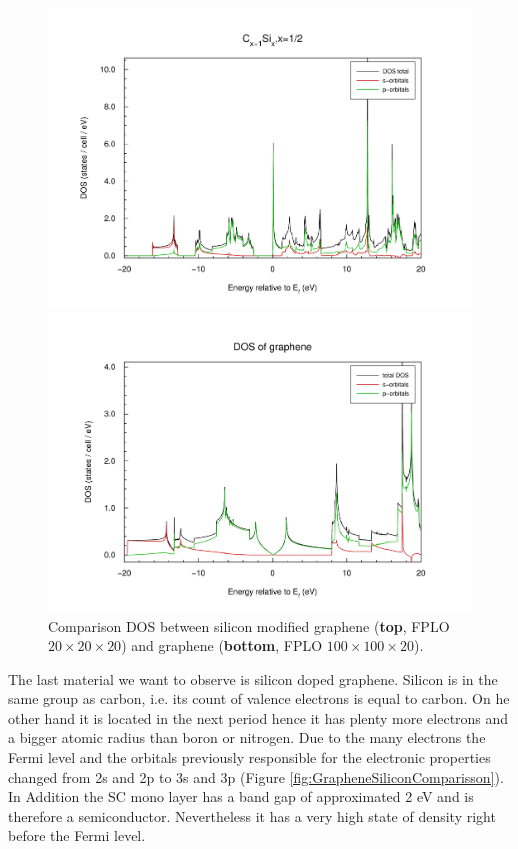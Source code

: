 				\begin{figure}
					\begin{minipage}[t]{\textwidth}
						\includegraphics[width=\textwidth]{Results/Silicon/Silicon1R/dos.pdf}
					\end{minipage}
					\begin{minipage}[t]{\textwidth}
						\includegraphics[width=\textwidth]{Results/Graphene/GrapheneNew/dos.pdf}
					\end{minipage}											
					\caption{Comparison DOS between silicon modified graphene (\textbf{top}, FPLO $20\times20\times20$) and graphene (\textbf{bottom}, FPLO $100\times100\times20$).}
					\label{fig:GrapheneSiliconDOSComparisson}
				\end{figure}
				The last material we want to observe is silicon doped graphene. Silicon is in the same group as carbon, i.e. its count of valence electrons is equal to carbon. On he other hand it is located in the next period hence it has plenty more electrons and a bigger atomic radius than boron or nitrogen. Due to the many electrons the Fermi level and the orbitals previously responsible for the electronic properties changed from 2s and 2p to 3s and 3p (Figure \ref{fig:GrapheneSiliconComparisson}). In Addition the SC mono layer has a band gap of approximated 2 eV and is therefore a semiconductor. Nevertheless it has a very high state of density right before the Fermi level. \\\\
